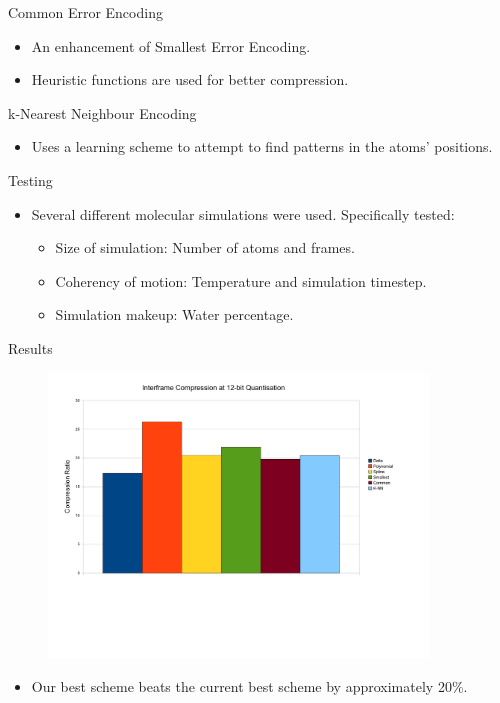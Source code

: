 \documentclass{beamer}
\begin{document}
\begin{frame}{Common Error Encoding}
\begin{itemize}
 \item An enhancement of Smallest Error Encoding.

 \item Heuristic functions are used for better compression.
\end{itemize}
\end{frame}

\begin{frame}{k-Nearest Neighbour Encoding}
\begin{itemize}
 \item Uses a learning scheme to attempt to find patterns in the atoms' positions.
\end{itemize}
\end{frame}

\begin{frame}{Testing}
\begin{itemize}
 \item Several different molecular simulations were used. Specifically tested:
 \begin{itemize}
   \item Size of simulation: Number of atoms and frames.
   \item Coherency of motion: Temperature and simulation timestep.
   \item Simulation makeup: Water percentage.
 \end{itemize}
 \end{itemize}
\end{frame}

\begin{frame}{Results}
\begin{figure}[h]
\centering \includegraphics[trim = 10mm 60mm 10mm 5mm, clip,
  width=0.9\textwidth]{julian-images/interframe_results.pdf}
\end{figure}
\begin{itemize}
\item Our best scheme beats the current best scheme by approximately 20\%.
\end{itemize}
\end{frame}
\end{document}
